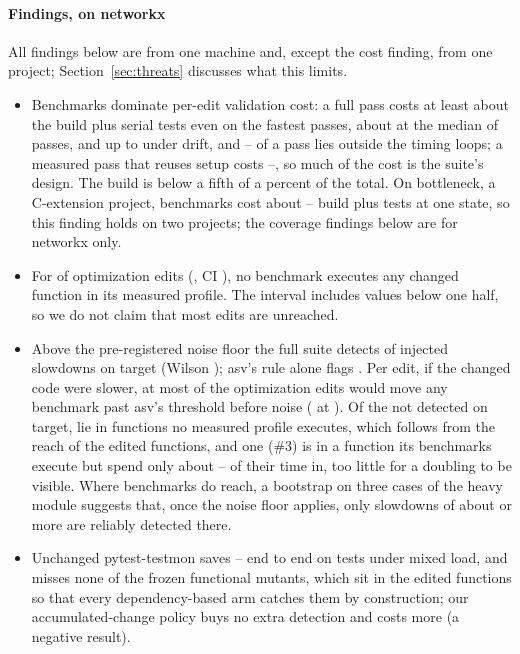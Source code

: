 \paragraph*{Findings, on networkx}
All findings below are from one machine and, except the cost finding, from one project; Section~\ref{sec:threats} discusses what this limits.
\begin{itemize}
\item[\textbf{F1}] Benchmarks dominate per-edit validation cost: a full pass costs at least about \NxBenchRatioTypical\x{} the build plus serial tests even on the fastest passes, about \NxBenchRatioMedian\x{} at the median of \NxBenchPasses{} passes, and up to \NxBenchRatioHi\x{} under drift, and \NxOutsideLoopsLo--\NxOutsideLoopsHi\pct{} of a pass lies outside the timing loops; a measured pass that reuses setup costs \ECachedRatioLo--\ECachedRatioHi\x, so much of the cost is the suite's design. The build is below a fifth of a percent of the total. On bottleneck, a C-extension project, benchmarks cost about \BnBenchRatioLo--\BnBenchRatioHi\x{} build plus tests at one state, so this finding holds on two projects; the coverage findings below are for networkx only.
\item[\textbf{F2}] For \BOneAgentUnreached{} of \NxAgentOpt{} optimization edits (\BOneAgentPct\pct, CI \ci{\BOneAgentLo}{\BOneAgentHi}), no benchmark executes any changed function in its measured profile. The interval includes values below one half, so we do not claim that most edits are unreached.
\item[\textbf{F3}] Above the pre-registered noise floor the full suite detects \FloorDetect{} of \NumSlowdowns{} injected slowdowns on target (Wilson \ci{\FloorDetectLo}{\FloorDetectHi}); asv's rule alone flags \SlowDetOnTarget. Per edit, if the changed code were \PowFactorMid\x{} slower, at most \EditsClearMid{} of the \NxAgentOpt{} optimization edits would move any benchmark past asv's threshold before noise (\EditsClearHigh{} at \PowFactorHigh\x). Of the \SlowUndetected{} not detected on target, \SlowUnreachedProfile{} lie in functions no measured profile executes, which follows from the reach of the edited functions, and one (\#3) is in a function its benchmarks execute but spend only about \ShareThreeLo--\ShareThreeHi{} of their time in, too little for a doubling to be visible. Where benchmarks do reach, a bootstrap on three cases of the heavy module suggests that, once the noise floor applies, only slowdowns of about \PowFactorOneFive\x{} or more are reliably detected there.
\item[\textbf{F4}] Unchanged pytest-testmon saves \TestmonRatioLo--\TestmonRatioHi\x{} end to end on tests under mixed load, and misses none of the frozen functional mutants, which sit in the edited functions so that every dependency-based arm catches them by construction; our accumulated-change policy buys no extra detection and costs more (a negative result).
\end{itemize}

